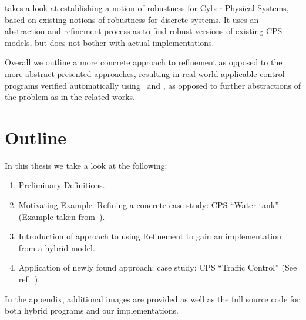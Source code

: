 \cite{Robustness} takes a look at establishing a notion of robustness for Cyber-Physical-Systems, based on existing notions of robustness for discrete systems. It uses an abstraction and refinement process as to find robust versions of existing CPS models, but does not bother with actual implementations.

Overall we outline a more concrete approach to refinement as opposed to the more abstract presented approaches, resulting in real-world applicable control programs verified automatically using \key~and \keym, as opposed to further abstractions of the problem as in the related works.

\section{Outline}
\label{sec:Outline}

In this thesis we take a look at the following:

\begin{enumerate}[label=\bfseries \Roman*:]

\item Preliminary Definitions.
\item Motivating Example: Refining a concrete case study: CPS ``Water tank'' (Example taken from~\cite{keymaeraGuide}).
\item Introduction of approach to using Refinement to gain an implementation from a hybrid model.
\item Application of newly found approach: case study: CPS ``Traffic Control'' (See ref.~\cite{TrafficControl}).
\end{enumerate}

In the appendix, additional images are provided as well as the full source code for both hybrid programs and our implementations.